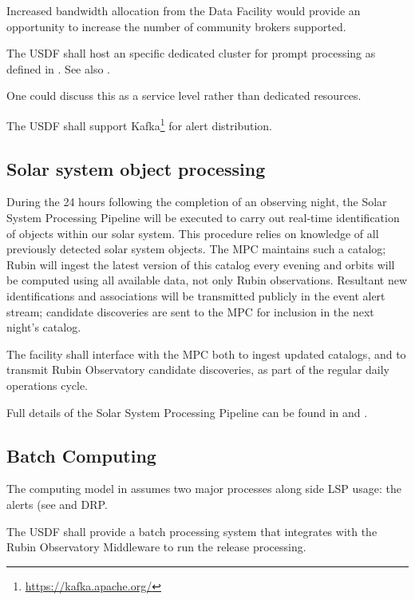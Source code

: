Increased bandwidth allocation from the Data Facility would provide an opportunity
to increase the number of community brokers supported.


\reqsimp{}{}{}{}{} {The USDF shall host an specific dedicated cluster for
prompt processing as defined in . See also .
\label{req:alerts}}

One could discuss this as a service level rather than dedicated resources.

\reqsimp{}{}{}{}{} {The USDF shall support Kafka\footnote{\url{https://kafka.apache.org/}} for alert distribution.
\label{req:alertdist}}

\subsection {Solar system object processing}

During the 24 hours following the completion of an observing night, the Solar System Processing Pipeline will be executed to carry out real-time identification of objects within our solar system.
This procedure relies on knowledge of all previously detected solar system objects.
The \gls{MPC} maintains such a catalog; Rubin will ingest the latest version of this catalog every evening and orbits will be computed using all available data, not only Rubin observations.
Resultant new identifications and associations will be transmitted publicly in the
event alert stream; candidate discoveries are sent to the \gls{MPC} for inclusion
in the next night's catalog.

\reqsimp{}{}{}{}{}
{
The facility shall interface with the \gls{MPC}
both to ingest updated catalogs, and to transmit Rubin Observatory candidate discoveries, as part of the regular daily operations cycle.
}

Full details of the Solar System Processing Pipeline can be found in  and .

\subsection { Batch Computing}
The computing model in  assumes two major processes along side \gls{LSP} usage: the alerts (see  and DRP.

\reqsimp{}{}{}{}{}
{
The USDF shall provide a batch processing system that integrates with the
Rubin Observatory Middleware to run the release processing. \label{req:drp}
}

